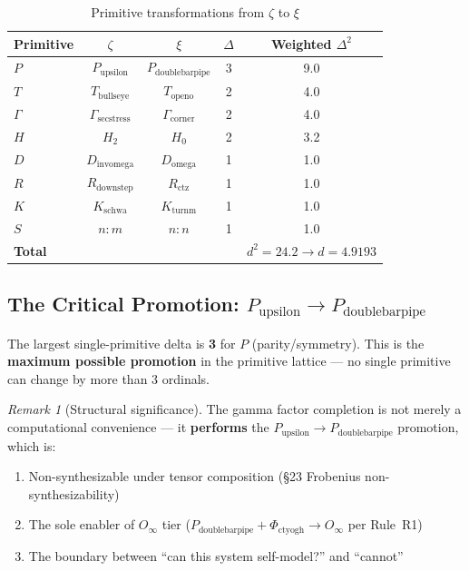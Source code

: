\documentclass[12pt,oneside]{article}
\theoremstyle{definition}
\theoremstyle{remark}
\newtheorem{remark}[theorem]{Remark}
\newcommand{\Domega}{D_{\text{omega}}}
\newcommand{\Dinvomega}{D_{\text{invomega}}}
\newcommand{\Topeno}{T_{\text{openo}}}
\newcommand{\Tbullseye}{T_{\text{bullseye}}}
\newcommand{\Rdownstep}{R_{\text{downstep}}}
\newcommand{\Rctz}{R_{\text{ctz}}}
\newcommand{\Pdoublebarpipe}{P_{\text{doublebarpipe}}}
\newcommand{\Pupsilon}{P_{\text{upsilon}}}
\newcommand{\Kschwa}{K_{\text{schwa}}}
\newcommand{\Kturnm}{K_{\text{turnm}}}
\newcommand{\Gammacorner}{\Gamma_{\text{corner}}}
\newcommand{\Gammasecstress}{\Gamma_{\text{secstress}}}
\newcommand{\Phictyogh}{\Phi_{\text{ctyogh}}}
\newcommand{\Hzero}{H_0}
\newcommand{\Htwo}{H_2}
\begin{document}
\begin{table}[htbp]
\centering
\caption{Primitive transformations from $\zeta$ to $\xi$}
\begin{tabular}{lcccc}
\toprule
Primitive & $\zeta$ & $\xi$ & $\Delta$ & Weighted $\Delta^2$ \\
\midrule
$P$ & $\Pupsilon$            & $\Pdoublebarpipe$ & 3 & 9.0 \\
$T$ & $\Tbullseye$           & $\Topeno$         & 2 & 4.0 \\
$\Gamma$ & $\Gammasecstress$ & $\Gammacorner$    & 2 & 4.0 \\
$H$ & $\Htwo$                & $\Hzero$          & 2 & 3.2 \\
$D$ & $\Dinvomega$           & $\Domega$         & 1 & 1.0 \\
$R$ & $\Rdownstep$           & $\Rctz$           & 1 & 1.0 \\
$K$ & $\Kschwa$              & $\Kturnm$         & 1 & 1.0 \\
$S$ & $n{:}m$                & $n{:}n$           & 1 & 1.0 \\
\midrule
\multicolumn{3}{l}{\textbf{Total}} & & $d^2 = 24.2 \to d = 4.9193$ \\
\bottomrule
\end{tabular}
\end{table}

\subsection{The Critical Promotion: $\Pupsilon \to \Pdoublebarpipe$}

The largest single-primitive delta is \textbf{3} for $P$ (parity/symmetry). This is the \textbf{maximum possible promotion} in the primitive lattice --- no single primitive can change by more than 3 ordinals.

\begin{remark}[Structural significance]
The gamma factor completion is not merely a computational convenience --- it \textbf{performs} the $\Pupsilon \to \Pdoublebarpipe$ promotion, which is:

\begin{enumerate}
\item Non-synthesizable under tensor composition (\S23 Frobenius non-synthesizability)
\item The sole enabler of $O_\infty$ tier ($\Pdoublebarpipe + \Phictyogh \to O_\infty$ per Rule~R1)
\item The boundary between ``can this system self-model?'' and ``cannot''
\end{enumerate}
\end{remark}
\end{document}
